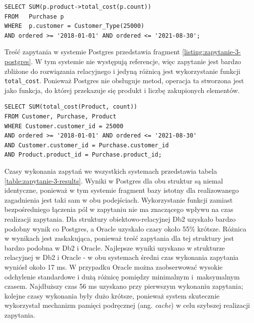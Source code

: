 \documentclass[a4paper,twoside,12pt]{book}
\begin{document}
\begin{lstlisting}[style=SQL, caption={Zapytanie trzecie w Db2.}, label={listing:zapytanie-3-db2}, captionpos=b]
SELECT SUM(p.product->total_cost(p.count))
FROM   Purchase p
WHERE  p.customer = Customer_Type(25000)
AND ordered >= '2018-01-01' AND ordered <= '2021-08-30';
\end{lstlisting}

Treść zapytania w systemie Postgres przedstawia fragment \ref{listing:zapytanie-3-postgres}. W tym systemie nie występują referencje, więc zapytanie jest bardzo zbliżone do rozwiązania relacyjnego i jedyną różnicą jest wykorzystanie funkcji \lstinline{total_cost}. Ponieważ Postgres nie obsługuje metod, operacja ta stworzona jest jako funkcja, do której przekazuje się produkt i liczbę zakupionych elementów. 

\begin{minipage}{\linewidth}
\begin{lstlisting}[style=SQL, caption={Zapytanie trzecie w Postgres}, label={listing:zapytanie-3-postgres}, captionpos=b]
SELECT SUM(total_cost(Product, count))
FROM Customer, Purchase, Product
WHERE Customer.customer_id = 25000
AND ordered >= '2018-01-01' AND ordered <= '2021-08-30'
AND Customer.customer_id = Purchase.customer_id
AND Product.product_id = Purchase.product_id;
\end{lstlisting}
\end{minipage}

Czasy wykonania zapytań we wszystkich systemach przedstawia tabela \ref{table:zapytanie-3-results}. Wyniki w Postgres dla obu struktur są niemal identyczne, ponieważ w tym systemie fragment bazy istotny dla realizowanego zagadnienia jest taki sam w obu podejściach. Wykorzystanie funkcji zamiast bezpośredniego łączenia pól w zapytaniu nie ma znaczącego wpływu na czas realizacji zapytania. Dla struktury obiektowo-relacyjnej Db2 uzyskało bardzo podobny wynik co Postgres, a Oracle uzyskało czasy około 55\% krótsze. Różnica w wynikach jest zaskakująca, ponieważ treść zapytania dla tej struktury jest bardzo podobna w Db2 i Oracle. Najlepsze wyniki uzyskano w strukturze relacyjnej w Db2 i Oracle - w obu systemach średni czas wykonania zapytania wyniósł około 17 ms. W przypadku Oracle można zaobserwować wysokie odchylenie standardowe i dużą różnicę pomiędzy minimalnym i~maksymalnym czasem. Najdłuższy czas 56 ms uzyskano przy pierwszym wykonaniu zapytania; kolejne czasy wykonania były dużo krótsze, ponieważ system skutecznie wykorzystał mechanizm pamięci podręcznej (ang. \textit{cache}) w celu szybszej realizacji zapytania.
\end{document}
